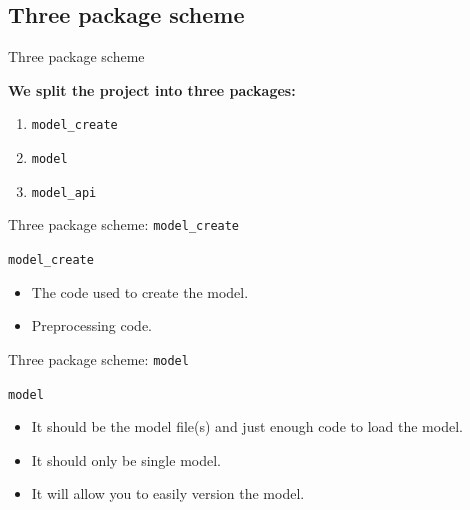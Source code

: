 \documentclass[10pt]{beamer}
\begin{document}

\subsection{Three package scheme}

\begin{frame}[fragile]{Three package scheme}

  \textbf{We split the project into three packages:}
  \begin{enumerate}
    \item \texttt{model\_create}
    \item \texttt{model}
    \item \texttt{model\_api}
  \end{enumerate}
\end{frame}

\begin{frame}[fragile]{Three package scheme: \texttt{model\_create}}
  
  \texttt{model\_create}
  \begin{itemize}
    \item The code used to create the model.
    \item Preprocessing code.
  \end{itemize}

\end{frame}

\begin{frame}[fragile]{Three package scheme: \texttt{model}}
  
  \texttt{model}
  \begin{itemize}        
    \item It should be the model file(s) and just enough code to load the model.
    \item It should only be single model.
    \item It will allow you to easily version the model.
  \end{itemize}

\end{frame}
\end{document}
